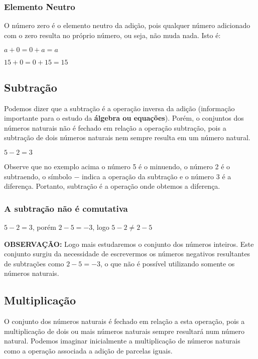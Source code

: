 \subsubsection{Elemento Neutro}
O número zero é o elemento neutro da adição, pois qualquer número adicionado com o zero resulta no próprio número, ou seja, não muda nada. Isto é:
\begin{center}
    $a+0=0+a=a$
\end{center}

\begin{example}
    $15+0=0+15=15$    
\end{example}

\subsection{Subtração}

Podemos dizer que a subtração é a operação inversa da adição (informação importante para o estudo da \textbf{álgebra ou equações}). Porém, o conjuntos dos números naturais não é fechado em relação a operação subtração, pois a subtração de dois números naturais nem sempre resulta em um número natural.

\begin{example}
    $5-2=3$
\end{example}

Observe que no exemplo acima o número 5 é o minuendo, o número 2 é o subtraendo, o símbolo $-$ indica a operação da subtração e o número 3 é a diferença. Portanto, subtração é a operação onde obtemos a diferença.

\subsubsection{A subtração não é comutativa}

\begin{center}
    $5-2=3$, porém $2-5=-3$, logo $5-2 \neq 2-5$  
\end{center}

\textbf{OBSERVAÇÃO:} Logo mais estudaremos o conjunto dos números inteiros. Este conjunto surgiu da necessidade de escrevermos os números negativos resultantes de subtrações como $2-5=-3$, o que não é possível utilizando somente os números naturais.

\subsection{Multiplicação}
O conjunto dos números naturais é fechado em relação a esta operação, pois a multiplicação de dois ou mais números naturais sempre resultará num número natural. Podemos imaginar inicialmente a multiplicação de números naturais como a operação associada a adição de parcelas iguais. 

